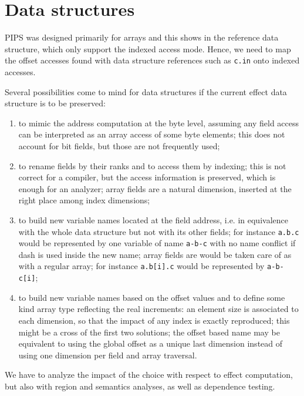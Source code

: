 \documentclass[a4paper]{report}
\begin{document}
\section{Data structures}
\label{section:data-structures}

PIPS was designed primarily for arrays and this shows in the reference
 data structure, which only support the indexed access mode. Hence, we
 need to map the offset accesses found with data structure references
 such as \verb/c.in/ onto indexed accesses.

Several possibilities come to mind for data structures if the current
 effect data structure is to be preserved:
\begin{enumerate}

\item to mimic the address computation at the byte level, assuming any
 field access can be interpreted as an array access of some byte
 elements; this does not account for bit fields, but those are not frequently used;

\item to rename fields by their ranks and to access them by indexing;
 this is not correct for a compiler, but the access information is
 preserved, which is enough for an analyzer; array fields are a
 natural dimension, inserted at the right place among index
 dimensions;

\item to build new variable names located at the field address,
 i.e. in equivalence with the whole data structure but not with its
 other fields; for instance \verb/a.b.c/ would be represented by one
 variable of name \verb/a-b-c/ with no name conflict if dash is used
 inside the new name; array fields are would be taken care of as with
 a regular array; for instance \verb/a.b[i].c/ would be represented by
 \verb/a-b-c[i]/;

\item to build new variable names based on the offset values and to
 define some kind array type reflecting the real increments: an
 element size is associated to each dimension, so that the impact of
 any index is exactly reproduced; this might be a cross of the first
 two solutions; the offset based name may be equivalent to using the
 global offset as a unique last dimension instead of using one
 dimension per field and array traversal.

\end{enumerate}

We have to analyze the impact of the choice with respect to effect
 computation, but also with region and semantics analyses, as well as
 dependence testing.
\end{document}
